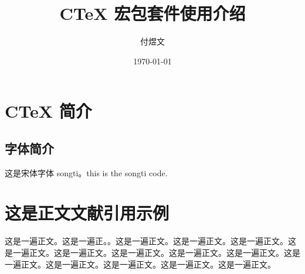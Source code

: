 \documentclass[UTF8,fontset = windows,zihao=-4,scheme=chinese,space=auto,linespread=1.25,twocolumn]{ctexart}
\title{\heiti CTeX 宏包套件使用介绍}
\author{\kaishu 付煜文}
\date{\today}
\begin{document}
		\maketitle
		
		\let\saved\thepage  %
		\let\thepage\relax	%
		
		\begin{abstract}
			\lipsum[1]
		\end{abstract}
		
		\newpage
		\tableofcontents	%
		
		\newpage
		\let\thepage\saved %
		\setcounter{page}{1}	%
		
		\section{CTeX 简介}
		\subsection{字体简介}
		\songti 这是\cite{.2004b}宋体字体 songti。this is the songti code. \\
		
		\newpage
		\section{这是正文文献引用示例}
		这是一遍正文。\cite{RN169}这是一遍正。\cite{.2005c}。这是一遍正文。这是一遍正文。这是一遍正文。这是一遍正文。这是一遍正文。这是一遍正文。这是一遍正文。这是一遍正文。这是一遍正文。这是一遍正文。这是一遍正文。这是一遍正文。这是一遍正文。\lipsum[3-5]

		
		\clearpage	 %
		
\end{document}
